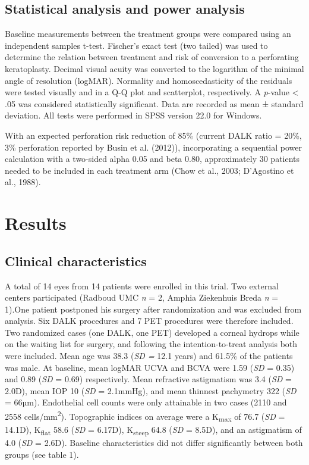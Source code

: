 \documentclass[authordate, empirical]{jote-new-article}
\begin{document}
	\subsection{Statistical analysis and power analysis}



	Baseline measurements between the treatment groups were compared using an independent samples t-test. Fischer's exact test (two tailed) was used to determine the relation between treatment and risk of conversion to a perforating keratoplasty. Decimal visual acuity was converted to the logarithm of the minimal angle of resolution (logMAR). Normality and homoscedasticity of the residuals were tested visually and in a Q-Q plot and scatterplot, respectively. A \emph{p}-value < .05 was considered statistically significant. Data are recorded as mean ± standard deviation. All tests were performed in SPSS version 22.0 for Windows.



	With an expected perforation risk reduction of 85\% (current DALK ratio = 20\%, 3\% perforation reported by Busin et al. (2012)), incorporating a sequential power calculation with a two-sided alpha 0.05 and beta 0.80, approximately 30 patients needed to be included in each treatment arm\textsuperscript{ }(Chow et al., 2003; D'Agostino et al., 1988).



	\section{Results}

	\subsection{Clinical characteristics}



	A total of 14 eyes from 14 patients were enrolled in this trial. Two external centers participated (Radboud UMC \emph{n }= 2, Amphia Ziekenhuis Breda \emph{n} = 1).One patient postponed his surgery after randomization and was excluded from analysis. Six DALK procedures and 7 PET procedures were therefore included. Two randomized cases (one DALK, one PET) developed a corneal hydrops while on the waiting list for surgery, and following the intention-to-treat analysis both were included. Mean age was 38.3 (\emph{SD =} 12.1 years) and 61.5\% of the patients was male. At baseline, mean logMAR UCVA and BCVA were 1.59 (\emph{SD }=\emph{ }0.35) and 0.89 (\emph{SD }=\emph{ }0.69) respectively. Mean refractive astigmatism was 3.4 (\emph{SD }=\emph{ }2.0D), mean IOP 10 (\emph{SD }=\emph{ }2.1mmHg), and mean thinnest pachymetry 322 (\emph{SD }=\emph{ }66µm). Endothelial cell counts were only attainable in two cases (2110 and 2558 cells/mm\textsuperscript{2}). Topographic indices on average were a K\textsubscript{max} of 76.7 (\emph{SD }=\emph{ }14.1D), K\textsubscript{flat} 58.6 (\emph{SD }=\emph{ }6.17D), K\textsubscript{steep} 64.8 (\emph{SD }=\emph{ }8.5D), and an astigmatism of 4.0 (\emph{SD }=\emph{ }2.6D). Baseline characteristics did not differ significantly between both groups (see table 1).
	
\end{document}
